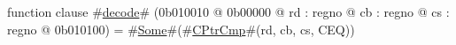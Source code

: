 function clause #\hyperref[zdecode]{decode}# (0b010010 @ 0b00000 @ rd : regno @ cb : regno @ cs : regno @ 0b010100) = #\hyperref[zSome]{Some}#(#\hyperref[zCPtrCmp]{CPtrCmp}#(rd, cb, cs, CEQ))
